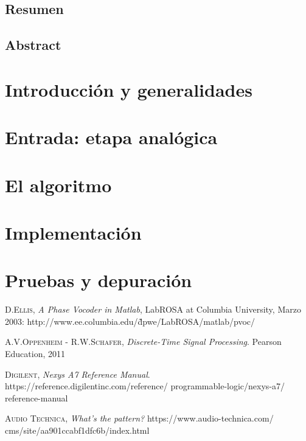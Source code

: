 \documentclass[a4paper, 11pt, oneside, openright]{report}
\begin{document}
\newpage
\vspace*{5cm}


\newpage
\section*{Resumen}

\section*{Abstract}


\newpage
\thispagestyle{empty}
\tableofcontents
\clearpage
{}
\pagestyle{fancy}
\chapter{Introducción y generalidades}


\chapter{Entrada: etapa analógica}


\chapter{El algoritmo}


\chapter{Implementación}


\chapter{Pruebas y depuración}


\begin{thebibliography}{aaa}

	\textsc{D.Ellis},
	\textit{A Phase Vocoder in Matlab},
	LabROSA at Columbia University,
	Marzo 2003: 
	http://www.ee.columbia.edu/\~dpwe/LabROSA/matlab/pvoc/
	
	\textsc{A.V.Oppenheim - R.W.Schafer},
	\textit{Discrete-Time Signal Processing}.
	Pearson Education, 2011
	
	\textsc{Digilent},
	\textit{Nexys A7 Reference Manual}.
	https://reference.digilentinc.com/reference/ programmable-logic/nexys-a7/	  reference-manual
	
	\textsc{Audio Technica},
	\textit{What's the pattern?}
	https://www.audio-technica.com/ cms/site/aa901ccabf1dfc6b/index.html
	
\end{thebibliography}
\end{document}
